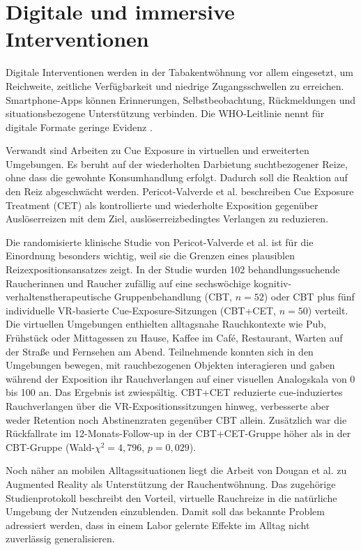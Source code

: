 \section{Digitale und immersive Interventionen}

Digitale Interventionen werden in der Tabakentwöhnung vor allem eingesetzt, um Reichweite, zeitliche Verfügbarkeit und niedrige Zugangsschwellen zu erreichen. Smartphone-Apps können Erinnerungen, Selbstbeobachtung, Rückmeldungen und situationsbezogene Unterstützung ver\-binden. Die WHO-Leitlinie nennt für digitale Formate geringe Evidenz \cite{who_tobacco_cessation_guideline_2024}. 

Verwandt sind Arbeiten zu Cue Exposure in virtuellen und erweiterten Umgebungen. Es beruht auf der wiederholten Darbietung suchtbezogener Reize, ohne dass die gewohnte Konsumhandlung erfolgt. Dadurch soll die Reaktion auf den Reiz abgeschwächt werden. Pericot-Valverde et al. beschreiben Cue Exposure Treatment (CET) als kontrollierte und wiederholte Exposition gegenüber Auslöserreizen mit dem Ziel, auslöserreizbedingtes Verlangen zu reduzieren. \\
\cite{pericot_valverde_vr_smoking_cessation_2019}

Die randomisierte klinische Studie von Pericot-Valverde et al. ist für die Einordnung besonders wichtig, weil sie die Grenzen eines plausiblen Reizexpositionsansatzes zeigt. In der Studie wurden 102 behandlungssuchende Raucherinnen und Raucher zufällig auf eine sechswöchige kognitiv-verhaltenstherapeutische Gruppenbehandlung (CBT, \(n=52\)) oder CBT plus fünf individuelle VR-basierte Cue-Exposure-Sitzungen (CBT+CET, \(n=50\)) verteilt. Die virtuellen Umgebungen enthielten alltagsnahe Rauchkontexte wie Pub, Frühstück oder Mittagessen zu Hause, Kaffee im Café, Restaurant, Warten auf der Straße und Fernsehen am Abend. Teilnehmende konnten sich in den Umgebungen bewegen, mit rauchbezogenen Objekten interagieren und gaben während der Exposition ihr Rauchverlangen auf einer visuellen Analogskala von 0 bis 100 an. Das Ergebnis ist zwiespältig. CBT+CET reduzierte cue-induziertes Rauchverlangen über die VR-Expositionssitzungen hinweg, verbesserte aber weder Retention noch Abstinenzraten gegenüber CBT allein. Zusätzlich war die Rückfallrate im 12-Monats-Follow-up in der CBT+CET-Gruppe höher als in der CBT-Gruppe (Wald-\(\chi^2=4{,}796\), \(p=0{,}029\)). \\
\cite{pericot_valverde_vr_smoking_cessation_2019}

Noch näher an mobilen Alltagssituationen liegt die Arbeit von Dougan et al. zu Augmented Reality als Unterstützung der Rauchentwöhnung. Das zugehörige Studienprotokoll beschreibt den Vorteil, virtuelle Rauchreize in die natürliche Umgebung der Nutzenden einzublenden. Damit soll das bekannte Problem adressiert werden, dass in einem Labor gelernte Effekte im Alltag nicht zuverlässig generalisieren. \\
\cite{dougan_ar_smoking_cessation_2025}

